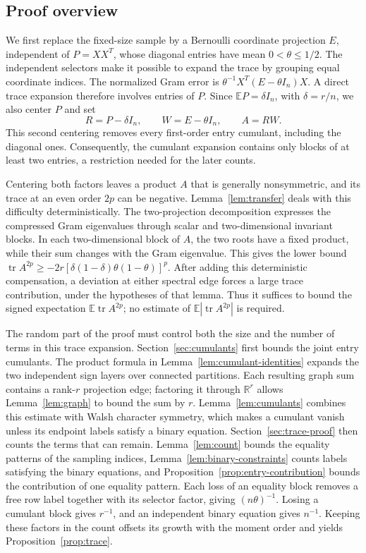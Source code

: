\documentclass[11pt]{article}
\theoremstyle{definition}
\theoremstyle{remark}
\theoremstyle{plain}
\newcommand{\E}{\mathbb E}
\newcommand{\R}{\mathbb R}
\DeclareMathOperator{\tr}{tr}
\begin{document}
\subsection*{Proof overview}

We first replace the fixed-size sample by a Bernoulli coordinate
projection $E$, independent of $P=XX^T$, whose diagonal entries
have mean $0<\theta\le1/2$. The independent selectors make it possible to
expand the trace by grouping equal coordinate indices. The normalized
Gram error is $\theta^{-1}X^T(E-\theta I_n)X$.
A direct trace expansion therefore involves entries of $P$.
Since $\E P=\delta I_n$, with $\delta=r/n$, we also center $P$ and set
\[
 R=P-\delta I_n,\qquad W=E-\theta I_n,\qquad A=RW.
\]
This second centering removes every first-order entry cumulant,
including the diagonal ones. Consequently, the cumulant expansion
contains only blocks of at least two entries, a restriction needed
for the later counts.

Centering both factors leaves a product $A$ that is generally
nonsymmetric, and its trace at an even order $2p$ can be negative.
Lemma~\ref{lem:transfer} deals with this difficulty deterministically.
The two-projection decomposition expresses the compressed Gram
eigenvalues through scalar and two-dimensional invariant blocks.
In each two-dimensional block of $A$, the two roots have a fixed
product, while their sum changes with the Gram eigenvalue.
This gives the lower bound
$\tr A^{2p}\ge-2r[\delta(1-\delta)\theta(1-\theta)]^p$.
After adding this deterministic compensation, a deviation at either
spectral edge forces a large trace contribution, under the
hypotheses of that lemma. Thus it suffices to bound the signed
expectation $\E\tr A^{2p}$; no estimate of
$\E|\tr A^{2p}|$ is required.

The random part of the proof must control both the size and the
number of terms in this trace expansion. Section~\ref{sec:cumulants}
first bounds the joint entry cumulants. The product formula in
Lemma~\ref{lem:cumulant-identities} expands the two independent sign
layers over connected partitions. Each resulting graph sum contains
a rank-$r$ projection edge; factoring it through $\R^r$ allows
Lemma~\ref{lem:graph} to bound the sum by $r$.
Lemma~\ref{lem:cumulants} combines this estimate with Walsh character
symmetry, which makes a cumulant vanish unless its endpoint labels
satisfy a binary equation. Section~\ref{sec:trace-proof} then counts
the terms that can remain. Lemma~\ref{lem:count} bounds the equality
patterns of the sampling indices, Lemma~\ref{lem:binary-constraints}
counts labels satisfying the binary equations, and
Proposition~\ref{prop:entry-contribution} bounds the contribution of
one equality pattern. Each loss of an equality block removes a free
row label together with its selector factor, giving $(n\theta)^{-1}$.
Losing a cumulant block gives $r^{-1}$, and an independent binary
equation gives $n^{-1}$.
Keeping these factors in the count offsets its growth with the
moment order and yields Proposition~\ref{prop:trace}.
\end{document}
